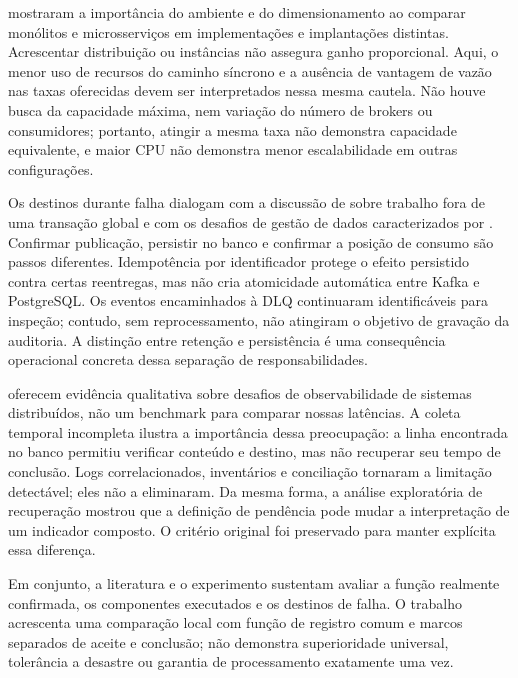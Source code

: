  mostraram a importância do ambiente e do dimensionamento ao comparar monólitos e microsserviços em implementações e implantações distintas. Acrescentar distribuição ou instâncias não assegura ganho proporcional. Aqui, o menor uso de recursos do caminho síncrono e a ausência de vantagem de vazão nas taxas oferecidas devem ser interpretados nessa mesma cautela. Não houve busca da capacidade máxima, nem variação do número de brokers ou consumidores; portanto, atingir a mesma taxa não demonstra capacidade equivalente, e maior CPU não demonstra menor escalabilidade em outras configurações.

Os destinos durante falha dialogam com a discussão de  sobre trabalho fora de uma transação global e com os desafios de gestão de dados caracterizados por . Confirmar publicação, persistir no banco e confirmar a posição de consumo são passos diferentes. Idempotência por identificador protege o efeito persistido contra certas reentregas, mas não cria atomicidade automática entre Kafka e PostgreSQL. Os eventos encaminhados à DLQ continuaram identificáveis para inspeção; contudo, sem reprocessamento, não atingiram o objetivo de gravação da auditoria. A distinção entre retenção e persistência é uma consequência operacional concreta dessa separação de responsabilidades.

 oferecem evidência qualitativa sobre desafios de observabilidade de sistemas distribuídos, não um benchmark para comparar nossas latências. A coleta temporal incompleta ilustra a importância dessa preocupação: a linha encontrada no banco permitiu verificar conteúdo e destino, mas não recuperar seu tempo de conclusão. Logs correlacionados, inventários e conciliação tornaram a limitação detectável; eles não a eliminaram. Da mesma forma, a análise exploratória de recuperação mostrou que a definição de pendência pode mudar a interpretação de um indicador composto. O critério original foi preservado para manter explícita essa diferença.

Em conjunto, a literatura e o experimento sustentam avaliar a função realmente confirmada, os componentes executados e os destinos de falha. O trabalho acrescenta uma comparação local com função de registro comum e marcos separados de aceite e conclusão; não demonstra superioridade universal, tolerância a desastre ou garantia de processamento exatamente uma vez.

